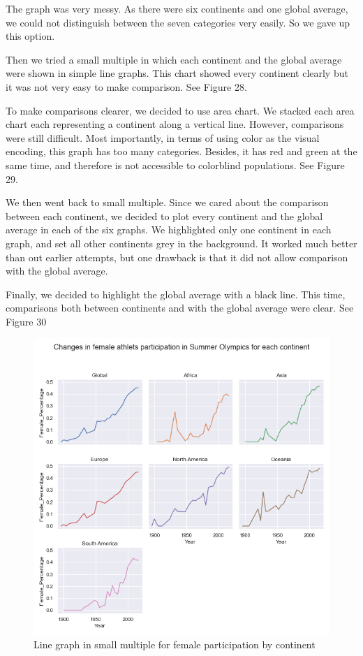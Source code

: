 \documentclass[12pt]{article}
\begin{document}
The graph was very messy. As there were six continents and one global average, we could not distinguish between the seven categories very easily. So we gave up this option. 

Then we tried a small multiple in which each continent and the global average were shown in simple line graphs. This chart showed every continent clearly but it was not very easy to make comparison. See Figure 28.

To make comparisons clearer, we decided to use area chart. We stacked each area chart each representing a continent along a vertical line. However, comparisons were still difficult. Most importantly, in terms of using color as the visual encoding, this graph has too many categories. Besides, it has red and green at the same time, and therefore is not accessible to colorblind populations. See Figure 29.

We then went back to small multiple. Since we cared about the comparison between each continent, we decided to plot every continent and the global average in each of the six graphs. We highlighted only one continent in each graph, and set all other continents grey in the background. It worked much better than out earlier attempts, but one drawback is that it did not allow comparison with the global average. 

Finally, we decided to highlight the global average with a black line. This time, comparisons both between continents and with the global average were clear. See Figure 30
\begin{figure}
    \centering
    \includegraphics[scale=0.35]{pics/g-2-2.png}
    \caption{Line graph in small multiple for female participation by continent}
    \label{fig:my_label}
\end{figure}
\end{document}
